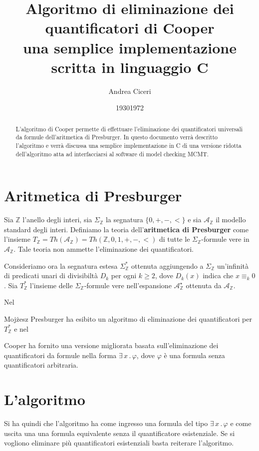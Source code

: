 \documentclass[11pt,letterpaper,twoside]{article}
\begin{document}
\title{%
  Algoritmo di eliminazione dei quantificatori di Cooper\\
  \large una semplice implementazione scritta in linguaggio C}
\author{Andrea Ciceri}
\maketitle

\begin{abstract}
  L'algoritmo di Cooper permette di effettuare l'eliminazione dei quantificatori
  universali da formule dell'aritmetica di Presburger. In questo documento
  verr\`a descritto l'algoritmo e verr\`a discussa una semplice implementazione
  in C di una versione ridotta dell'algoritmo atta ad interfacciarsi al
  software di model checking MCMT.  
\end{abstract}

\section{Aritmetica di Presburger}
Sia $\mathbb{Z}$ l'anello degli interi, sia $\Sigma_{\mathbb{Z}}$ la segnatura
$\{0, +, -, <\}$ e sia $\mathcal{A}_{\mathbb{Z}}$ il modello standard degli
interi.
Definiamo la teoria dell'\textbf{aritmetica di Presburger} come l'insieme
$T_{\mathbb{Z}}=Th(\mathcal{A}_{\mathbb{Z}})=Th(\mathbb{Z}, 0, 1, +, -, <)$ di
tutte le $\Sigma_{\mathbb{Z}}$-formule vere in $\mathcal{A}_{\mathbb{Z}}$.
Tale teoria non ammette l'eliminazione dei quantificatori.

Consideriamo ora la segnatura estesa $\Sigma_{\mathbb{Z}}^*$ ottenuta aggiungendo
a $\Sigma_{\mathbb{Z}}$ un'infinit\`a di predicati unari di divisibilt\`a $D_k$
per ogni $k \ge 2$, dove $D_k(x)$ indica che $x \equiv_k 0$.
Sia $T_{\mathbb{Z}}^*$ l'insieme delle $\Sigma_{\mathbb{Z}}$-formule vere
nell'espansione $\mathcal{A}_{\mathbb{Z}}^\star$ ottenuta da
$\mathcal{A}_{\mathbb{Z}}$.

Nel \date{1930} Moj\.zesz Presburger ha esibito un algoritmo di eliminazione dei
quantificatori per $T_{\mathbb{Z}}^*$ e nel \date{1972} Cooper ha fornito una
versione migliorata basata sull'eliminazione dei quantificatori da formule nella
forma $\exists \,x \,.\, \varphi$, dove $\varphi$ \`e una formula senza
quantificatori arbitraria.


\section{L'algoritmo}
Si ha quindi che l'algoritmo ha come ingresso una formula del tipo $\exists
\,x \,.\, \varphi$ e come uscita una una formula equivalente senza il
quantificatore esistenziale. Se si vogliono eliminare pi\`u quantificatori
esistenziali basta reiterare l'algoritmo.
\end{document}

